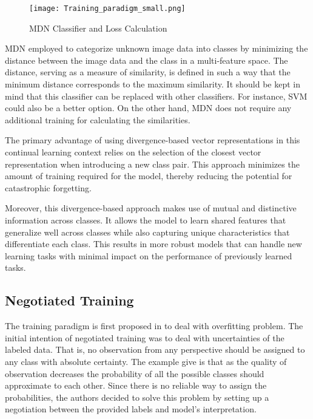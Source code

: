 \documentclass{article}
\begin{document}
\begin{figure}[ht]
\centering
\texttt{[image: Training\_paradigm\_small.png]}
\caption{MDN Classifier and Loss Calculation}
\label{fig:mdn_classifier_and_loss_calc}
\end{figure}



MDN employed to categorize unknown image data into classes by minimizing the distance between the image data and the class in a multi-feature space. The distance, serving as a measure of similarity, is defined in such a way that the minimum distance corresponds to the maximum similarity. It should be kept in mind that this classifier can be replaced with other classifiers. For instance, SVM could also be a better option. On the other hand, MDN does not require any additional training for calculating the similarities. 

The primary advantage of using divergence-based vector representations in this continual learning context relies on the selection of the closest vector representation when introducing a new class pair. This approach minimizes the amount of training required for the model, thereby reducing the potential for catastrophic forgetting.

Moreover, this divergence-based approach makes use of mutual and distinctive information across classes. It allows the model to learn shared features that generalize well across classes while also capturing unique characteristics that differentiate each class. This results in more robust models that can handle new learning tasks with minimal impact on the performance of previously learned tasks.


\subsection{Negotiated Training}


The training paradigm is first proposed in
\cite{korhan2023negotiated} to deal with overfitting problem. The initial intention of negotiated training was to deal with uncertainties of the labeled data. That is, no observation from any perspective should be assigned to any class with absolute certainty. The example give is that as the quality of observation decreases the probability of all the possible classes should approximate to each other. Since there is no reliable way to assign the probabilities, the authors decided to solve this problem by setting up a negotiation between the provided labels and model's interpretation. 
\end{document}
